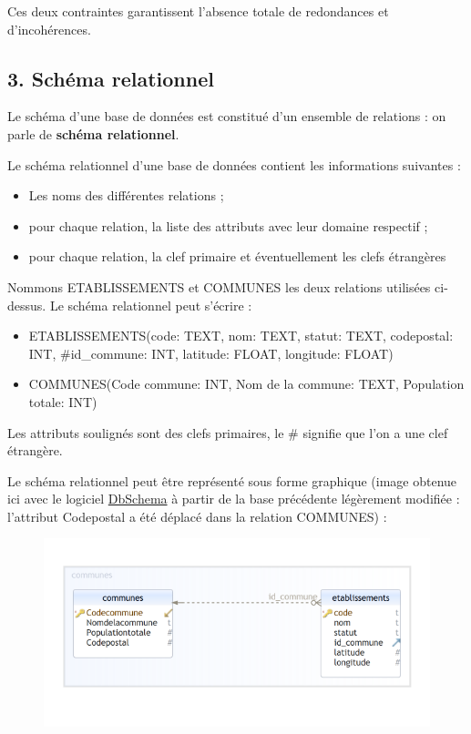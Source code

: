 \documentclass[
  letterpaper,
  DIV=11,
  numbers=noendperiod]{scrartcl}
\providecommand{\tightlist}{%
  \setlength{\itemsep}{0pt}\setlength{\parskip}{0pt}}\usepackage{longtable,booktabs,array}
\begin{document}
Ces deux contraintes garantissent l'absence totale de redondances et
d'incohérences.

\newpage{}

\hypertarget{schuxe9ma-relationnel}{%
\subsection{3. Schéma relationnel}\label{schuxe9ma-relationnel}}

Le schéma d'une base de données est constitué d'un ensemble de relations
: on parle de \textbf{schéma relationnel}.

Le schéma relationnel d'une base de données contient les informations
suivantes :

\begin{itemize}
\tightlist
\item
  Les noms des différentes relations ;
\item
  pour chaque relation, la liste des attributs avec leur domaine
  respectif ;
\item
  pour chaque relation, la clef primaire et éventuellement les clefs
  étrangères
\end{itemize}

Nommons ETABLISSEMENTS et COMMUNES les deux relations utilisées
ci-dessus. Le schéma relationnel peut s'écrire :

\begin{itemize}
\tightlist
\item
  ETABLISSEMENTS({code}: TEXT, nom: TEXT, statut: TEXT, codepostal: INT,
  \#id\_commune: INT, latitude: FLOAT, longitude: FLOAT)
\item
  COMMUNES({Code commune}: INT, Nom de la commune: TEXT, Population
  totale: INT)
\end{itemize}

Les attributs soulignés sont des clefs primaires, le \# signifie que
l'on a une clef étrangère.

Le schéma relationnel peut être représenté sous forme graphique (image
obtenue ici avec le logiciel
\href{https://dbschema.com/download.html}{DbSchema} à partir de la base
précédente légèrement modifiée : l'attribut Codepostal a été déplacé
dans la relation COMMUNES) :

\begin{figure}

{\centering \includegraphics{BDD11.png}

}

\end{figure}
\end{document}
